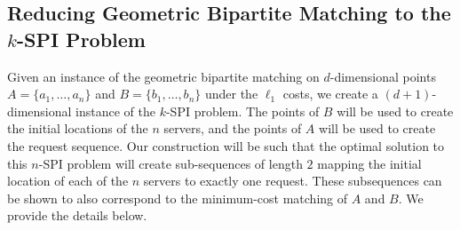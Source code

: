

\subsection{Reducing Geometric Bipartite Matching to the \texorpdfstring{$k$}{}-SPI Problem}\label{sec:reduction}

Given an instance of the geometric bipartite matching on $d$-dimensional points $A=\{a_1,\ldots, a_n\}$ and $B=\{b_1,\ldots, b_n\}$ under the $\ell_1$ costs, we create a $(d+1)$-dimensional instance of the $k$-SPI problem. The points of $B$ will be used to create the initial locations of the $n$ servers, and the points of $A$ will be used to create the request sequence. Our construction will be such that the optimal solution to this $n$-SPI problem will create sub-sequences of length $2$ mapping the initial location of each of the $n$ servers to exactly one request. These subsequences can be shown to also correspond to the minimum-cost matching of $A$ and $B$. We provide the details below. 

